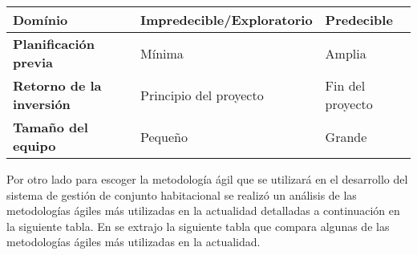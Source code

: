 \begin{table}[H]
\begin{tabular}{ |>{\bfseries}l|l|l| }
        \hline
        Domínio                                      & Impredecible/Exploratorio                        & Predecible                                               \\
        \hline
        Planificación previa                         & Mínima                                           & Amplia                                                   \\
        \hline
        Retorno de la inversión                      & Principio del proyecto                           & Fin del proyecto                                         \\
        \hline
        Tamaño del equipo                            & Pequeño                                          & Grande                                                   \\
        \hline
    \end{tabular}
\end{table}

Por otro lado para escoger la metodología ágil que se utilizará en el desarrollo del sistema de gestión de conjunto habitacional se realizó un análisis de las metodologías ágiles más utilizadas en la actualidad detalladas a continuación en la siguiente tabla.
En \cite{barriga_sanchez_sistema_2023} se extrajo la siguiente tabla que compara algunas de las metodologías ágiles más utilizadas en la actualidad.

